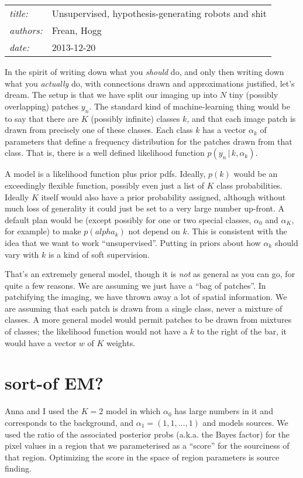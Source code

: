 \documentclass[12pt]{article}
\newcommand{\given}{\,|\,}
\begin{document}
\sloppy\sloppypar

\noindent
\begin{tabular}{ll}
\textsl{title:} & Unsupervised, hypothesis-generating robots and shit \\
\textsl{authors:} & Frean, Hogg \\
\textsl{date:}    & 2013-12-20
\end{tabular}
\bigskip

In the spirit of writing down what you \emph{should} do,
  and only then writing down what you \emph{actually} do,
  with connections drawn and approximations justified,
  let's dream.
The setup is that we have split our imaging up into $N$ tiny
  (possibly overlapping) patches $y_n$.
The standard kind of machine-learning thing would be to
  say that there are $K$ (possibly infinite) classes $k$,
  and that each image patch is drawn from precisely one of these classes.
Each class $k$ has a vector $\alpha_k$ of parameters
  that define a frequency distribution
  for the patches drawn from that class.
That is, there is a well defined likelihood function $p(y_n\given k, \alpha_k)$.

A model is a likelihood function plus prior pdfs.
Ideally, $p(k)$ would be an exceedingly flexible function,
  possibly even just a list of $K$ class probabilities.
Ideally $K$ itself would also have a prior probability assigned,
  although without much loss of generality
  it could just be set to a very large number up-front.
A default plan would be 
  (except possibly for one or two special classes,
   $\alpha_0$ and $\alpha_K$, for example)
  to make $p(alpha_k)$ not depend on $k$.
This is consistent with the idea that we want to work ``unsupervised''.
Putting in priors about how $\alpha_k$ should vary with $k$ is a kind of soft supervision.

That's an extremely general model,
  though it is \emph{not} as general as you can go,
  for quite a few reasons.
We are assuming we just have a ``bag of patches''.
In patchifying the imaging, we have thrown away a lot of spatial information.
We are assuming that each patch is drawn from a single class,
  never a mixture of classes.
A more general model would permit patches to be drawn from mixtures of classes;
  the likelihood function would not have a $k$ to the right of the bar,
  it would have a vector $w$ of $K$ weights.

\section{sort-of EM?}
Anna and I used the $K=2$ model in which $\alpha_0$ has large numbers
in it and corresponds to the background, and $\alpha_1 =
(1,1,\ldots,1)$ and models sources. We used the ratio of the
associated posterior probs (a.k.a. the Bayes factor) for the pixel
values in a region that we parameterised as a ``score'' for the
sourciness of that region.
Optimizing the score in the space of region parameters is source finding.
\end{document}
